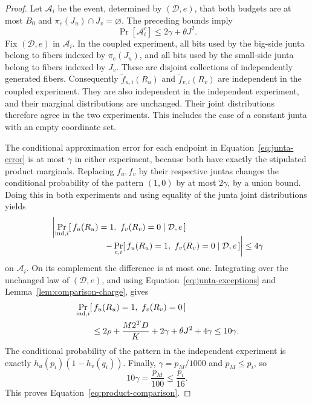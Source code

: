\begin{proof}
Let \(\mathcal A_i\) be the event, determined by
\((\mathcal D,e)\), that both budgets are at most \(B_0\) and
\(\pi_e(J_u)\cap J_v=\varnothing\).  The preceding bounds imply
\begin{equation}
\label{eq:junta-exceptions}
  \Pr[\mathcal A_i^c]\le2\gamma+\theta J^2.
\end{equation}
Fix \((\mathcal D,e)\) in \(\mathcal A_i\).
In the coupled experiment, all bits used by the big-side junta
belong to fibers indexed by \(\pi_e(J_u)\), and all bits used by
the small-side junta belong to fibers indexed by \(J_v\).
These are disjoint collections of independently generated fibers.
Consequently
\(\widetilde f_{u,i}(R_u)\) and
\(\widetilde f_{v,i}(R_v)\) are independent in the coupled
experiment.  They are also independent in the independent
experiment, and their marginal distributions are unchanged.
Their joint distributions therefore agree in the two experiments.
This includes the case of a constant junta with an empty
coordinate set.

The conditional approximation error for each endpoint in
Equation~\eqref{eq:junta-error} is at most \(\gamma\) in either
experiment, because both have exactly the stipulated product
marginals.  Replacing \(f_u,f_v\) by their respective juntas changes
the conditional probability of the pattern \((1,0)\) by at most
\(2\gamma\), by a union bound.  Doing this in both experiments and
using equality of the junta joint distributions yields
\begin{align*}
 &\left|
  \Pr_{\mathrm{ind},i}[\,f_u(R_u)=1,\ f_v(R_v)=0
                      \mid\mathcal D,e\,]
 \right.\\[-2mm]
 &\hspace{22mm}\left.
  -\Pr_{\mathrm c,i}[\,f_u(R_u)=1,\ f_v(R_v)=0
                      \mid\mathcal D,e\,]
  \right|\le4\gamma
\end{align*}
on \(\mathcal A_i\).
On its complement the difference is at most one.
Integrating over the unchanged law of \((\mathcal D,e)\), and using
Equation~\eqref{eq:junta-exceptions} and
Lemma~\ref{lem:comparison-charge}, gives
\begin{align}
\label{eq:product-comparison-error}
  &\Pr_{\mathrm{ind},i}[\,f_u(R_u)=1,\ f_v(R_v)=0\,]\notag\\
  &\qquad\le
  2\rho+\frac{M2^T D}{K}
      +2\gamma+\theta J^2+4\gamma
  \le10\gamma.
\end{align}
The conditional probability of the pattern in the independent
experiment is exactly \(h_u(p_i)(1-h_v(q_i))\).
Finally, \(\gamma=p_M/1000\) and \(p_M\le p_i\), so
\[
  10\gamma=\frac{p_M}{100}\le\frac{p_i}{16}.
\]
This proves Equation~\eqref{eq:product-comparison}.
\end{proof}

